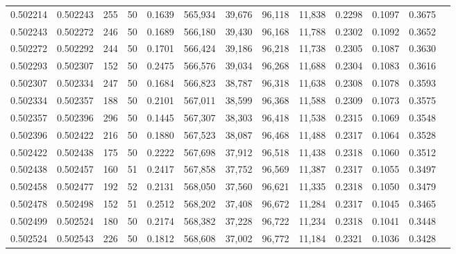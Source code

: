 \begin{tabular}{rrrrrrrrrrrrr}
0.502214 & 0.502243 & 255 &  50 &                                     0.1639 & 565,934 &  39,676 &  96,118 &  11,838 & 0.2298 & 0.1097 & 0.3675 \\
0.502243 & 0.502272 & 246 &  50 &                                     0.1689 & 566,180 &  39,430 &  96,168 &  11,788 & 0.2302 & 0.1092 & 0.3652 \\
0.502272 & 0.502292 & 244 &  50 &                                     0.1701 & 566,424 &  39,186 &  96,218 &  11,738 & 0.2305 & 0.1087 & 0.3630 \\
0.502293 & 0.502307 & 152 &  50 &                                     0.2475 & 566,576 &  39,034 &  96,268 &  11,688 & 0.2304 & 0.1083 & 0.3616 \\
0.502307 & 0.502334 & 247 &  50 &                                     0.1684 & 566,823 &  38,787 &  96,318 &  11,638 & 0.2308 & 0.1078 & 0.3593 \\
0.502334 & 0.502357 & 188 &  50 &                                     0.2101 & 567,011 &  38,599 &  96,368 &  11,588 & 0.2309 & 0.1073 & 0.3575 \\
0.502357 & 0.502396 & 296 &  50 &                                     0.1445 & 567,307 &  38,303 &  96,418 &  11,538 & 0.2315 & 0.1069 & 0.3548 \\
0.502396 & 0.502422 & 216 &  50 &                                     0.1880 & 567,523 &  38,087 &  96,468 &  11,488 & 0.2317 & 0.1064 & 0.3528 \\
0.502422 & 0.502438 & 175 &  50 &                                     0.2222 & 567,698 &  37,912 &  96,518 &  11,438 & 0.2318 & 0.1060 & 0.3512 \\
0.502438 & 0.502457 & 160 &  51 &                                     0.2417 & 567,858 &  37,752 &  96,569 &  11,387 & 0.2317 & 0.1055 & 0.3497 \\
0.502458 & 0.502477 & 192 &  52 &                                     0.2131 & 568,050 &  37,560 &  96,621 &  11,335 & 0.2318 & 0.1050 & 0.3479 \\
0.502478 & 0.502498 & 152 &  51 &                                     0.2512 & 568,202 &  37,408 &  96,672 &  11,284 & 0.2317 & 0.1045 & 0.3465 \\
0.502499 & 0.502524 & 180 &  50 &                                     0.2174 & 568,382 &  37,228 &  96,722 &  11,234 & 0.2318 & 0.1041 & 0.3448 \\
0.502524 & 0.502543 & 226 &  50 &                                     0.1812 & 568,608 &  37,002 &  96,772 &  11,184 & 0.2321 & 0.1036 & 0.3428 \\

\end{tabular}
